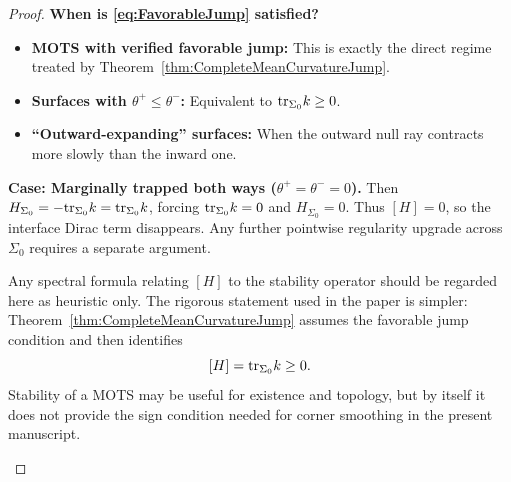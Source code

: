 \begin{proof}
\textbf{When is \eqref{eq:FavorableJump} satisfied?}
\begin{itemize}
    \item \textbf{MOTS with verified favorable jump:} This is exactly the direct regime treated by Theorem~\ref{thm:CompleteMeanCurvatureJump}.
    \item \textbf{Surfaces with $\theta^+ \le \theta^-$:} Equivalent to $\mathrm{tr}_{\Sigma_0} k \ge 0$.
    \item \textbf{``Outward-expanding'' surfaces:} When the outward null ray contracts more slowly than the inward one.
\end{itemize}

\textbf{Case: Marginally trapped both ways ($\theta^+ = \theta^- = 0$).} Then $H_{\Sigma_0} = -\mathrm{tr}_{\Sigma_0} k = \mathrm{tr}_{\Sigma_0} k$, forcing $\mathrm{tr}_{\Sigma_0} k = 0$ and $H_{\Sigma_0} = 0$. Thus $[H] = 0$, so the interface Dirac term disappears. Any further pointwise regularity upgrade across $\Sigma_0$ requires a separate argument.

\begin{remark}\label{rem:ReconcileFormulas}
Any spectral formula relating $[H]$ to the stability operator should be regarded here as heuristic only. The rigorous statement used in the paper is simpler: Theorem~\ref{thm:CompleteMeanCurvatureJump} assumes the favorable jump condition and then identifies
\[
    [H]=\mathrm{tr}_{\Sigma_0}k\ge0.
\]
Stability of a MOTS may be useful for existence and topology, but by itself it does not provide the sign condition needed for corner smoothing in the present manuscript.
\end{remark}
\end{proof}


